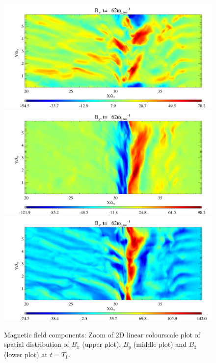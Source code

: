 \documentclass[structabstract]{aa}
\begin{document}
       \begin{figure}[t]
   \centering
  \includegraphics[width=\columnwidth]{15294f7a.png}
  \includegraphics[width=\columnwidth]{15294f7b.png}
  \includegraphics[width=\columnwidth]{15294f7c.png}
      \caption{Magnetic field components:  Zoom of 2D linear colourscale plot 
of spatial distribution of $B_x$ (upper plot), $B_y$ (middle plot) and $B_z$ 
(lower plot) at $t=T_1$.}
         \label{FigZoomB}
   \end{figure}
\end{document}
